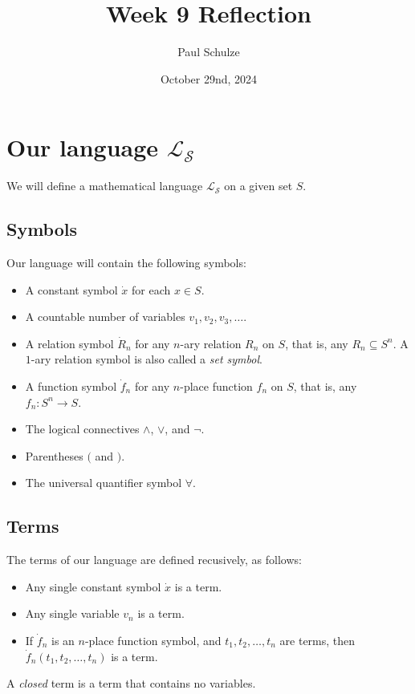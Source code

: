 \documentclass{article}
\title{Week 9 Reflection}
\author{Paul Schulze}
\date{October 29nd, 2024}
\begin{document}
\maketitle

\section{Our language $\mathcal{L}_\mathcal{S}$}
We will define a mathematical language $\mathcal{L}_\mathcal{S}$ on a given set $S$.
\subsection{Symbols}
Our language will contain the following symbols:
\begin{itemize}
    \item A constant symbol $\dot x$ for each $x \in S$.
    \item A countable number of variables $v_1, v_2, v_3, \ldots$.
    \item A relation symbol $\dot R_n$ for any $n$-ary relation $R_n$ on $S$, that is, any $R_n \subseteq S^n$. A $1$-ary relation symbol is also called a \textit{set symbol}.
    \item A function symbol $\dot f_n$ for any $n$-place function $f_n$ on $S$, that is, any $f_n : S^n \to S$.
    \item The logical connectives $\land$, $\lor$, and $\neg$.
    \item Parentheses $($ and $)$.
    \item The universal quantifier symbol $\forall$.
\end{itemize}

\subsection{Terms}
The terms of our language are defined recusively, as follows:
\begin{itemize}
    \item Any single constant symbol $\dot x$ is a term.
    \item Any single variable $v_n$ is a term.
    \item If $\dot f_n$ is an $n$-place function symbol, and $t_1, t_2, \ldots, t_n$ are terms, then $\dot f_n (t_1, t_2, \ldots, t_n)$ is a term.
\end{itemize}
A \textit{closed} term is a term that contains no variables.
\end{document}
